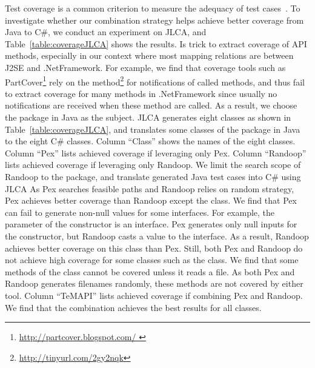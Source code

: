 Test coverage is a common criterion to measure the adequacy of test cases~\cite{zhu1997software}. To investigate whether our combination strategy helps achieve better coverage from Java to C\#, we conduct an experiment on JLCA, and Table~\ref{table:coverageJLCA} shows the results. Is trick to extract coverage of API methods, especially in our context where most mapping relations are between J2SE and .NetFramework. For example, we find that coverage tools such as PartCover\footnote{\url{http://partcover.blogspot.com/ }} rely on the  method\footnote{\url{http://tinyurl.com/2gy2nqk}} for notifications of called methods, and thus fail to extract coverage for many methods in .NetFramework since usually no notifications are received when these method are called. As a result, we choose the  package in Java as the subject. JLCA generates eight classes as shown in Table~\ref{table:coverageJLCA}, and translates some classes of the  package in Java to the eight C\# classes. Column ``Class'' shows the names of the eight classes. Column ``Pex'' lists achieved coverage if leveraging only Pex. Column ``Randoop'' lists  achieved coverage if leveraging only Randoop. We limit the search scope of Randoop to the  package, and translate generated Java test cases into C\# using JLCA As Pex searches feasible paths and Randoop relies on random strategy, Pex achieves better coverage than Randoop except the  class. We find that Pex can fail to generate non-null values for some interfaces. For example, the parameter of the  constructor is an interface. Pex generates only null inputs for the constructor, but Randoop casts a value to the interface. As a result, Randoop achieves better coverage on this class than Pex. Still, both Pex and Randoop do not achieve high coverage for some classes such as the  class. We find that some methods of the class cannot be covered unless it reads a file. As both Pex and Randoop generates filenames randomly, these methods are not covered by either tool. Column ``TeMAPI'' lists  achieved coverage if combining Pex and  Randoop. We find that the combination achieves the best results for all classes.

